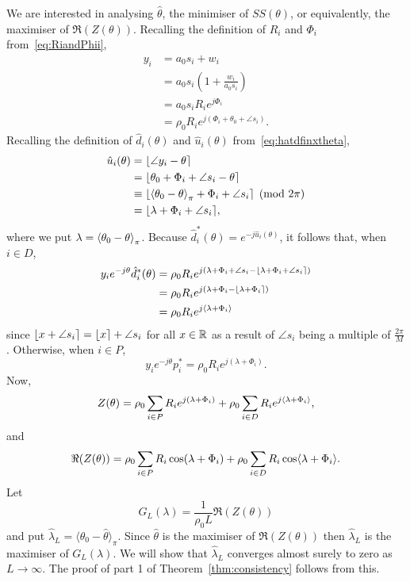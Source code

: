 \documentclass[journal]{IEEEtran}
\begin{document}
We are interested in analysing $\hat{\theta}$, the minimiser of $SS(\theta)$, or equivalently, the maximiser of $\Re(Z(\theta))$.  Recalling the definition of $R_i$ and $\Phi_i$ from~\eqref{eq:RiandPhii},
\begin{align*}
y_i &= a_0 s_i + w_i \\
&= a_0 s_i \left( 1 + \frac{w_i}{a_0 s_i} \right) \\
&= a_0 s_i R_i e^{j \Phi_i} \\
&= \rho_0 R_i e^{j ( \Phi_i + \theta_0 + \angle{s_i}) }.
\end{align*}
Recalling the definition of $\hat{d}_i(\theta)$ and $\hat{u}_i(\theta)$ from~\eqref{eq:hatdfinxtheta},
\begin{align*}
\hat{u}_i(\theta) &= {\left\lfloor \angle{y_i} - \theta \right\rceil} \\
&= {\left\lfloor \theta_0 + \Phi_i + \angle{s_i} - \theta \right\rceil} \\
&\equiv {\left\lfloor  \left\langle \theta_0 - \theta \right\rangle_{\pi} + \Phi_i + \angle{s_i} \right\rceil} \pmod{2\pi} \\
&= {\left\lfloor  \lambda + \Phi_i + \angle{s_i}  \right\rceil},
\end{align*}
where we put $\lambda = \left\langle \theta_0 - \theta \right\rangle_\pi$.  Because $\hat{d}_i^*(\theta) = e^{-j\hat{u}_i(\theta)}$, it follows that, when $i \in D$,
\begin{align}
 y_i e^{-j\theta} \hat{d}_i^*(\theta) &= \rho_0 R_i e^{j(\lambda + \Phi_i + \angle{s_i} - {\left\lfloor \lambda + \Phi_i + \angle{s_i} \right\rceil})} \nonumber \\
&= \rho_0 R_i e^{j(\lambda + \Phi_i - {\left\lfloor \lambda + \Phi_i \right\rceil})} \nonumber  \\
&= \rho_0 R_i e^{j\langle \lambda + \Phi_i \rangle} \label{eq:yethetadhat}
\end{align}
since ${\left\lfloor x + \angle{s_i} \right\rceil} = {\left\lfloor x \right\rceil} + \angle{s_i}$ for all $x \in {\mathbb R}$ as a result of $\angle{s_i}$ being a multiple of $\tfrac{2\pi}{M}$.  Otherwise, when $i \in P$,  
\[
y_i e^{-j\theta} p_i^* = \rho_0 R_i e^{j(\lambda + \Phi_i)}.
\]
Now,
\[
Z(\theta) = \rho_0 \sum_{i \in P} R_i e^{j(\lambda + \Phi_i)} + \rho_0  \sum_{i \in D} R_i e^{j\langle \lambda + \Phi_i \rangle},
\]
and
\[
\Re(Z(\theta)) = \rho_0 \sum_{i \in P} R_i \cos(\lambda + \Phi_i) + \rho_0 \sum_{i \in D} R_i \cos\langle \lambda + \Phi_i \rangle.
\] 
Let 
\begin{equation}\label{eq:GLdefn}
G_L(\lambda) = \frac{1}{\rho_0 L} \Re(Z(\theta))
\end{equation}
and put $\hat{\lambda}_L = \langle\theta_0 - \hat{\theta}\rangle_\pi$.  Since $\hat{\theta}$ is the maximiser of $\Re(Z(\theta))$ then  $\hat{\lambda}_L$ is the maximiser of $G_L(\lambda)$.  We will show that $\hat{\lambda}_L$ converges almost surely to zero as $L \rightarrow \infty$.  The proof of part 1 of Theorem~\ref{thm:consistency} follows from this.
\end{document}
